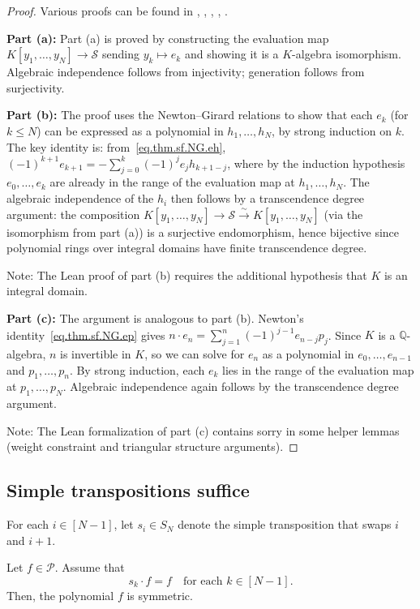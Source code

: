 \begin{proof}
Various proofs can be found in \cite[Theorem 171]{Benede25}, \cite[proof of Theorem 1]{BluCos16},
\cite[Theorem 1.2.1]{Dumas08}, \cite[Theorem 9.6.6]{Goodman}, \cite[\S 1.1]{Smith95}.

\textbf{Part (a):}
Part (a) is proved by constructing the evaluation map
$K[y_1, \ldots, y_N] \to \mathcal{S}$ sending $y_k \mapsto e_k$
and showing it is a $K$-algebra isomorphism.
Algebraic independence follows from injectivity;
generation follows from surjectivity.

\textbf{Part (b):}
The proof uses the Newton--Girard relations to show that each $e_k$ (for $k \leq N$)
can be expressed as a polynomial in $h_1, \ldots, h_N$, by strong induction on $k$.
The key identity is: from~\eqref{eq.thm.sf.NG.eh},
$(-1)^{k+1} e_{k+1} = -\sum_{j=0}^{k} (-1)^j e_j h_{k+1-j}$,
where by the induction hypothesis $e_0, \ldots, e_k$ are already in the range of the
evaluation map at $h_1, \ldots, h_N$. The algebraic independence of the $h_i$ then
follows by a transcendence degree argument: the composition
$K[y_1, \ldots, y_N] \to \mathcal{S} \xrightarrow{\sim} K[y_1, \ldots, y_N]$
(via the isomorphism from part (a)) is a surjective endomorphism, hence bijective
since polynomial rings over integral domains have finite transcendence degree.

Note: The Lean proof of part (b) requires the additional hypothesis that $K$ is an integral domain.

\textbf{Part (c):}
The argument is analogous to part (b). Newton's identity~\eqref{eq.thm.sf.NG.ep}
gives $n \cdot e_n = \sum_{j=1}^n (-1)^{j-1} e_{n-j} p_j$. Since $K$ is a
$\mathbb{Q}$-algebra, $n$ is invertible in $K$, so we can solve for $e_n$ as a
polynomial in $e_0, \ldots, e_{n-1}$ and $p_1, \ldots, p_n$. By strong induction,
each $e_k$ lies in the range of the evaluation map at $p_1, \ldots, p_N$.
Algebraic independence again follows by the transcendence degree argument.

Note: The Lean formalization of part (c) contains sorry in some helper lemmas
(weight constraint and triangular structure arguments).
\end{proof}

\subsection{Simple transpositions suffice}

\begin{lemma}
\label{lem.sf.simples-enough}
\leantarget
\leanok
For each $i \in [N-1]$, let $s_i \in S_N$ denote the simple transposition
that swaps $i$ and $i+1$.

Let $f \in \mathcal{P}$. Assume that
\begin{equation}
s_k \cdot f = f \quad \text{for each } k \in [N-1].
\label{eq.lem.sf.simples-enough.ass}
\end{equation}
Then, the polynomial $f$ is symmetric.
\end{lemma}

